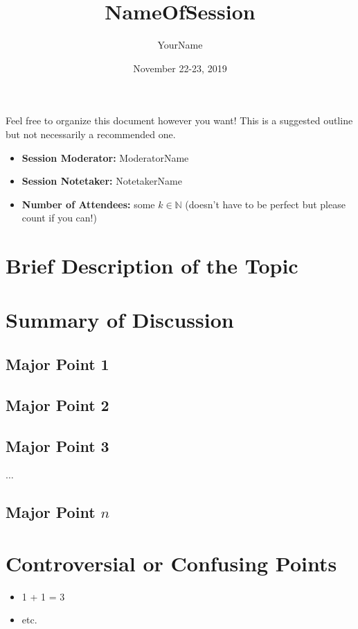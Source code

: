 \documentclass{article}
\title{NameOfSession}
\author{YourName}
\date{November 22-23, 2019}
\begin{document}
\maketitle

Feel free to organize this document however you want!
This is a suggested outline but not necessarily a recommended one.

\begin{itemize}[leftmargin=*,noitemsep]
  \item[] \textbf{Session Moderator: } ModeratorName
  \item[] \textbf{Session Notetaker: } NotetakerName
  \item[] \textbf{Number of Attendees: } some $k \in \mathds{N}$ (doesn't have to be perfect but please count if you can!)
\end{itemize}




\section{Brief Description of the Topic}

\section{Summary of Discussion}
\subsection{Major Point 1}
\subsection{Major Point 2}
\subsection{Major Point 3}
$\dots$
\subsection{Major Point $n$}

\section{Controversial or Confusing Points}
\begin{itemize}
    \item 1 + 1 = 3
    \item etc.
\end{itemize}{}
\end{document}
